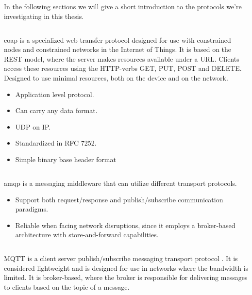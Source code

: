 In the following sections we will give a short introduction to the protocols we're
investigating in this thesis.



\subsection{}

\gls{coap} is a specialized web transfer protocol designed for use with
constrained nodes and constrained networks in the Internet of Things. It is
based on the REST model, where the server makes resources available  under a
URL. Clients access these resources using the HTTP-verbs GET, PUT, POST and
DELETE. Designed to use minimal resources, both on the device and on the
network.

\begin{itemize}
    \item Application level protocol.
    \item Can carry any data format.
    \item UDP on IP.
    \item Standardized in RFC 7252.
    \item Simple binary base header format
\end{itemize}


\subsection{}

\gls{amqp} is a messaging middleware that can utilize different transport
protocols.

\begin{itemize}
    \item Support both request/response and publish/subscribe communication
    paradigms.
    \item Reliable when facing network disruptions, since it employs a
    broker-based architecture with store-and-forward capabilities.
\end{itemize}

\subsection{}

MQTT is a client server publish/subscribe messaging transport protocol
\cite{oasis-mqtt}. It is considered lightweight and is designed for use in networks
where the bandwidth is limited. It is broker-based, where the broker is
responsible for delivering messages to clients based on the topic of a
message.

